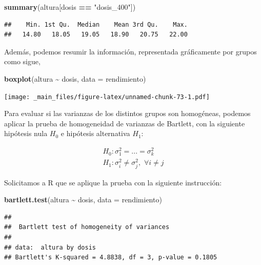 \documentclass[
]{book}
\newenvironment{Shaded}{\begin{snugshade}}{\end{snugshade}}
\newcommand{\AttributeTok}[1]{\textcolor[rgb]{0.13,0.29,0.53}{#1}}
\newcommand{\FunctionTok}[1]{\textcolor[rgb]{0.13,0.29,0.53}{\textbf{#1}}}
\newcommand{\NormalTok}[1]{#1}
\newcommand{\SpecialCharTok}[1]{\textcolor[rgb]{0.81,0.36,0.00}{\textbf{#1}}}
\newcommand{\StringTok}[1]{\textcolor[rgb]{0.31,0.60,0.02}{#1}}
\begin{document}
\begin{Shaded}
\begin{Highlighting}[]
\FunctionTok{summary}\NormalTok{(altura[dosis }\SpecialCharTok{==} \StringTok{"dosis\_400"}\NormalTok{])}
\end{Highlighting}
\end{Shaded}

\begin{verbatim}
##    Min. 1st Qu.  Median    Mean 3rd Qu.    Max. 
##   14.80   18.05   19.05   18.90   20.75   22.00
\end{verbatim}

Además, podemos resumir la información, representada gráficamente por grupos como sigue,

\begin{Shaded}
\begin{Highlighting}[]
\FunctionTok{boxplot}\NormalTok{(altura }\SpecialCharTok{\textasciitilde{}}\NormalTok{ dosis, }\AttributeTok{data =}\NormalTok{ rendimiento)}
\end{Highlighting}
\end{Shaded}

\texttt{[image: \_main\_files/figure-latex/unnamed-chunk-73-1.pdf]}

Para evaluar si las varianzas de los distintos grupos son homogéneas, podemos aplicar la prueba de homogeneidad de varianzas de Bartlett, con la siguiente hipótesis nula \(H_0\) e hipótesis alternativa \(H_1\):

\[ \begin{matrix}
H_0:\sigma_1^2=...=\sigma_k^2\\
H_1:\sigma_i^2 \neq \sigma_j^2, \,\, \forall i\neq j
\end{matrix}\]

Solicitamos a R que se aplique la prueba con la siguiente instrucción:

\begin{Shaded}
\begin{Highlighting}[]
\FunctionTok{bartlett.test}\NormalTok{(altura }\SpecialCharTok{\textasciitilde{}}\NormalTok{ dosis, }\AttributeTok{data =}\NormalTok{ rendimiento)}
\end{Highlighting}
\end{Shaded}

\begin{verbatim}
## 
##  Bartlett test of homogeneity of variances
## 
## data:  altura by dosis
## Bartlett's K-squared = 4.8838, df = 3, p-value = 0.1805
\end{verbatim}
\end{document}
